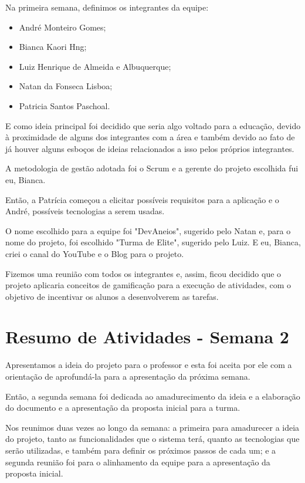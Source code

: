 \begin{apendicesenv}
Na primeira semana, definimos os integrantes da equipe:

\begin{itemize}
\item André Monteiro Gomes;
\item Bianca Kaori Hng;
\item Luiz Henrique de Almeida e Albuquerque;
\item Natan da Fonseca Lisboa;
\item Patricia Santos Paschoal.
\end{itemize}

E como ideia principal foi decidido que seria algo voltado para a educação, devido à proximidade de alguns dos integrantes com a área e também devido ao fato de já houver alguns esboços de ideias relacionados a isso pelos próprios integrantes. 

A metodologia de gestão adotada foi o Scrum e a gerente do projeto escolhida fui eu, Bianca.

Então, a Patrícia começou a elicitar possíveis requisitos para a aplicação e o André, possíveis tecnologias a serem usadas.

O nome escolhido para a equipe foi "DevAneios", sugerido pelo Natan e, para o nome do projeto, foi escolhido "Turma de Elite", sugerido pelo Luiz. E eu, Bianca, criei o canal do YouTube e o Blog para o projeto.

Fizemos uma reunião com todos os integrantes e, assim, ficou decidido que o projeto aplicaria conceitos de gamificação para a execução de atividades, com o objetivo de incentivar os alunos a desenvolverem as tarefas.


\section{Resumo de Atividades - Semana 2}
Apresentamos a ideia do projeto para o professor e esta foi aceita por ele com a orientação de aprofundá-la para a apresentação da próxima semana. 

Então, a segunda semana foi dedicada ao amadurecimento da ideia e a elaboração do documento e a apresentação da proposta inicial para a turma. 

Nos reunimos duas vezes ao longo da semana: a primeira para amadurecer a ideia do projeto, tanto as funcionalidades que o sistema terá, quanto as tecnologias que serão utilizadas, e também para definir os próximos passos de cada um; e a segunda reunião foi para o alinhamento da equipe para a apresentação da proposta inicial.


\end{apendicesenv}
